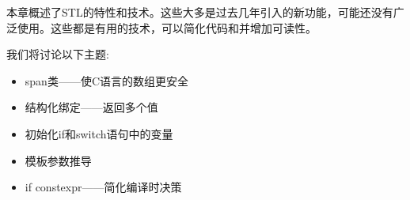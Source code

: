 
本章概述了STL的特性和技术。这些大多是过去几年引入的新功能，可能还没有广泛使用。这些都是有用的技术，可以简化代码和并增加可读性。

我们将讨论以下主题:

\begin{itemize}
\item 
span类——使C语言的数组更安全

\item 
结构化绑定——返回多个值

\item 
初始化if和switch语句中的变量

\item 
模板参数推导

\item 
if constexpr——简化编译时决策
\end{itemize}

